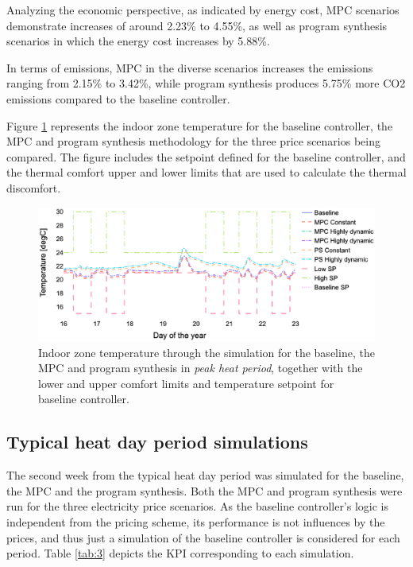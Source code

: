 Analyzing the economic perspective, as indicated by energy cost, MPC scenarios demonstrate increases of around 2.23\% to 4.55\%, as well as program synthesis scenarios in which the energy cost increases by 5.88\%. 

In terms of emissions, MPC in the diverse scenarios increases the emissions ranging from 2.15\% to 3.42\%, while program synthesis produces 5.75\% more CO2 emissions compared to the baseline controller.

Figure \ref{fig:temp-peak} represents the indoor zone temperature for the baseline controller, the MPC and program synthesis methodology for the three price scenarios being compared. The figure includes the setpoint defined for the baseline controller, and the thermal comfort upper and lower limits that are used to calculate the thermal discomfort.

\begin{figure}
  \includegraphics[scale=.4]{images/boptest/Fig4.eps}
\caption{Indoor zone temperature through the simulation for the baseline, the MPC and program synthesis in \emph{peak heat period}, together with the lower and upper comfort limits and temperature setpoint for baseline controller.}
\label{fig:temp-peak}       %
\end{figure}

\newpage
\subsection{Typical heat day period simulations}
\label{'results_typical'}
The second week from the typical heat day period was simulated for the baseline, the MPC and the program synthesis. Both the MPC and program synthesis were run for the three electricity price scenarios. As the baseline controller's logic is independent from the pricing scheme, its performance is not influences by the prices, and thus just a simulation of the baseline controller is considered for each period. Table \ref{tab:3} depicts the KPI corresponding to each simulation.

